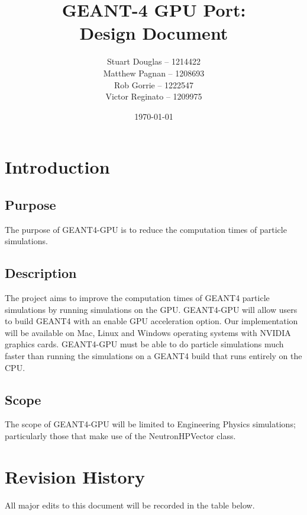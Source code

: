 \documentclass[12pt]{article}
\begin{document}
\title{
\LARGE GEANT-4 GPU Port:
\\\vspace{10mm}
\large \textbf{Design Document}
\vspace{20mm}
}
\author{
Stuart Douglas -- 1214422
\\Matthew Pagnan -- 1208693
\\Rob Gorrie -- 1222547
\\Victor Reginato -- 1209975
\vspace{10mm}
}
\date{\today}
	
\maketitle
\newpage

\tableofcontents
 
\section{Introduction}%
\subsection{Purpose}
The purpose of GEANT4-GPU is to reduce the computation times of particle simulations.
\subsection{Description}
The project aims to improve the computation times of GEANT4 particle simulations by running simulations on the GPU. GEANT4-GPU will allow users to 
build GEANT4 with an enable GPU acceleration option. Our implementation will be available on Mac, Linux and Windows operating systems with NVIDIA graphics cards. GEANT4-GPU must be able to do particle simulations much faster than running the simulations on a GEANT4 build that runs entirely on the CPU.
\subsection{Scope}
The scope of GEANT4-GPU will be limited to Engineering Physics simulations; particularly those that make use of the NeutronHPVector class.


\section*{Revision History}
All major edits to this document will be recorded in the table below.
\end{document}
